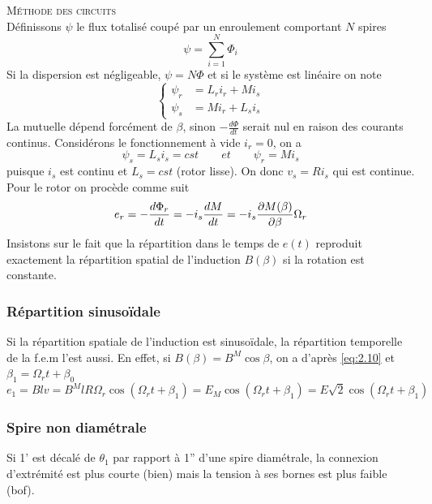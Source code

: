 		\textsc{Méthode des circuits}\\
		Définissons $\psi$ le flux totalisé coupé par un enroulement comportant $N$ spires
		\begin{equation}
		\psi = \sum _{i=1} ^N \Phi _i
		\end{equation}
		Si la dispersion est négligeable, $\psi = N\Phi$ et si le système est linéaire on note 
		\begin{equation}
		\left\{
		\begin{aligned}
		\psi _r &= L_ri_r + Mi_s\\
		\psi _s &= Mi_r + L_si_s
		\end{aligned}
		\right.
		\end{equation}
		La mutuelle dépend forcément de $\beta$, sinon $-\frac{d\Phi}{dt}$ serait nul en raison des courants continus. Considérons le fonctionnement à vide $i_r=0$, on a 
		\begin{equation}
			\psi _s = L_s i_s = cst \qquad et \qquad \psi _r = Mi_s
		\end{equation}
		puisque $i_s$ est continu et $L_s=cst$ (rotor lisse). On donc $v_s = Ri_s$ qui est continue. Pour le rotor on procède comme suit 
		\begin{equation}
			\begin{aligned}
				e_r = -\frac{d\Phi _r}{dt} = -i_s \frac{dM}{dt} = -i_s \frac{\D M(\beta )}{\D \beta} \Omega _r
			\end{aligned}
		\end{equation}		 
		Insistons sur le fait que la répartition dans le temps de $e(t)$ reproduit exactement la répartition spatial de l'induction $B(\beta)$ si la rotation est constante. 
		
		\subsubsection{Répartition sinusoïdale}
			Si la répartition spatiale de l'induction est sinusoïdale, la répartition temporelle de la f.e.m l'est aussi. En effet, si $B(\beta )= B^M\cos \beta$, on a d'après \autoref{eq:2.10} et $\beta _1 = \Omega _r t + \beta _0$
			\begin{equation}
				e_1 = Blv = B^M lR\Omega _r \cos (\Omega _r t + \beta _1) = E_M \cos (\Omega _r t + \beta _1) = E\sqrt{2}\cos (\Omega _r t + \beta _1)
			\end{equation}
		
		
		\subsubsection{Spire non diamétrale}
		Si 1' est décalé de $\theta_1$ par rapport à 1'' d'une spire 
		diamétrale, la connexion d'extrémité est plus courte (bien) 
		mais la tension à ses bornes est plus faible (bof).
		
